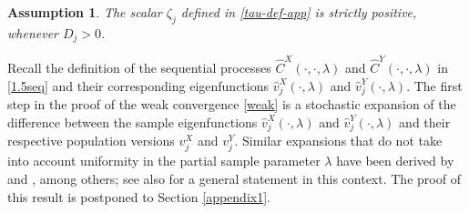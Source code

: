 \documentclass[11pt]{article}
\newtheorem{assumption}{Assumption}[section]
\numberwithin{equation}{section}
\numberwithin{theorem}{section}
\numberwithin{lemma}{section}
\numberwithin{proposition}{section}
\numberwithin{cor}{section}
\numberwithin{definition}{section}
\numberwithin{cons}{section}
\numberwithin{rem}{section}
\numberwithin{exa}{section}
\numberwithin{table}{section}
\numberwithin{figure}{section}
\numberwithin{algo}{section}
\begin{document}
{{\begin{assumption} \label{var-pos} The scalar $\zeta_j$ defined in \eqref{tau-def-app} is strictly positive, whenever  $D_{j} >0$.
\end{assumption}

Recall the definition of the sequential processes $\hat C^{X} (\cdot, \cdot, \lambda) $ and $\hat C^{Y} (\cdot, \cdot, \lambda) $  in \eqref{1.5seq} and their corresponding eigenfunctions $\hat v^X_j (\cdot, \lambda)$ and $\hat v^Y_j (\cdot, \lambda)$.
The first step in the proof of the weak convergence \eqref{weak} is a stochastic expansion  of the difference between the sample eigenfunctions $\hat v^{X}_{j} (\cdot, \lambda)$ and $\hat v^{Y}_{j} (\cdot, \lambda)$ and their respective population versions $v^X_j$ and $v^Y_j$. Similar expansions that do not take into account uniformity in the partial sample parameter $\lambda$ have been derived by \cite{kokoreim2013} and \cite{hallhoss2006}, among others; see also \cite{dauxois1982} for a general statement in this context. The proof of this result is postponed to Section \ref{appendix1}.

}}
\end{document}
